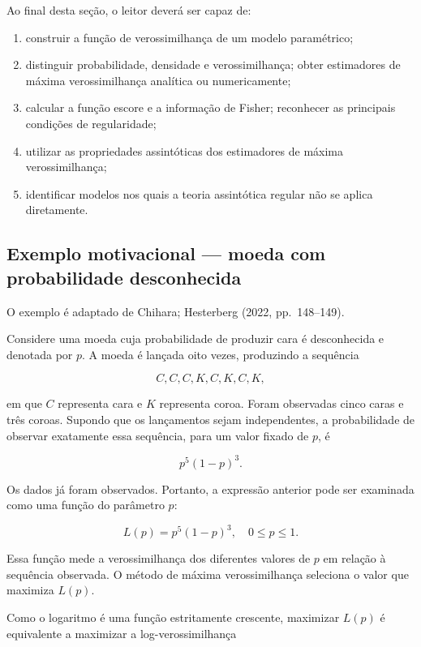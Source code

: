 \documentclass[
  letterpaper,
  DIV=11,
  numbers=noendperiod]{scrreprt}
\begin{document}
Ao final desta seção, o leitor deverá ser capaz de:

\begin{enumerate}
\def\labelenumi{\arabic{enumi}.}
\item
  construir a função de verossimilhança de um modelo paramétrico;
\item
  distinguir probabilidade, densidade e verossimilhança; obter
  estimadores de máxima verossimilhança analítica ou numericamente;
\item
  calcular a função escore e a informação de Fisher; reconhecer as
  principais condições de regularidade;
\item
  utilizar as propriedades assintóticas dos estimadores de máxima
  verossimilhança;
\item
  identificar modelos nos quais a teoria assintótica regular não se
  aplica diretamente.
\end{enumerate}

\subsection*{Exemplo motivacional --- moeda com probabilidade
desconhecida}\label{exemplo-motivacional-moeda-com-probabilidade-desconhecida}

O exemplo é adaptado de Chihara; Hesterberg (2022, pp.~148--149).

Considere uma moeda cuja probabilidade de produzir cara é desconhecida e
denotada por \(p\). A moeda é lançada oito vezes, produzindo a sequência

\[C, C, C, K, C, K, C, K,\]

em que \(C\) representa cara e \(K\) representa coroa. Foram observadas
cinco caras e três coroas. Supondo que os lançamentos sejam
independentes, a probabilidade de observar exatamente essa sequência,
para um valor fixado de \(p\), é

\[p^5(1-p)^3.\]

Os dados já foram observados. Portanto, a expressão anterior pode ser
examinada como uma função do parâmetro \(p\):

\[L(p) = p^5(1-p)^3, \quad 0 \leq p \leq 1.\]

Essa função mede a verossimilhança dos diferentes valores de \(p\) em
relação à sequência observada. O método de máxima verossimilhança
seleciona o valor que maximiza \(L(p)\).

Como o logaritmo é uma função estritamente crescente, maximizar \(L(p)\)
é equivalente a maximizar a log-verossimilhança
\end{document}
